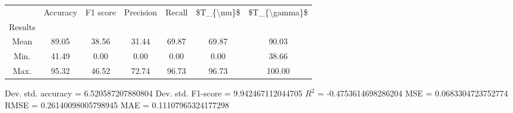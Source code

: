 \begin{tabular}{|c|c|c|c|c|c|c|}
\toprule
{} &  Accuracy &  F1 score &  Precision &  Recall &  \$T\_\{\textbackslash mu\}\$ &  \$T\_\{\textbackslash gamma\}\$ \\
Results &           &           &            &         &            &               \\
\hline
Mean    &     89.05 &     38.56 &      31.44 &   69.87 &      69.87 &         90.03 \\
Min.    &     41.49 &      0.00 &       0.00 &    0.00 &       0.00 &         38.66 \\
Max.    &     95.32 &     46.52 &      72.74 &   96.73 &      96.73 &        100.00 \\
\bottomrule
\end{tabular}

 Dev. std. accuracy = 6.520587207880804
 Dev. std. F1-score = 9.942467112044705
 $R^2$ = -0.4753614698286204
 MSE = 0.0683304723752774
 RMSE = 0.26140098005798945
 MAE = 0.11107965324177298